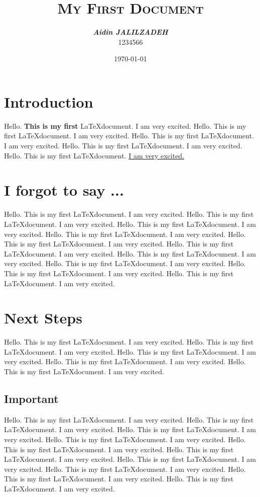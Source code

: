 \documentclass[a4paper,11pt]{article}
\title{\textsc{My First Document}}
\author{\textbf{\textit{\Large Aidin JALILZADEH}} \\ {\tiny 1234566}}
\date{\today}
\begin{document}
\maketitle

\section{Introduction}
Hello. \textbf{This is my first} \LaTeX document. I am very excited. Hello. This is my first \LaTeX document. I am very excited. Hello. This is my first \LaTeX document. I am very excited. Hello. This is my first \LaTeX document. I am very excited. Hello. This is my first \LaTeX document. \underline{I am very excited.}

\section{I forgot to say ...}
Hello. This is my first \LaTeX document. I am very excited. Hello. This is my first \LaTeX document. I am very excited. Hello. This is my first \LaTeX document. I am very excited. Hello. This is my first \LaTeX document. I am very excited. Hello. This is my first \LaTeX document. I am very excited. Hello. This is my first \LaTeX document. I am very excited. Hello. This is my first \LaTeX document. I am very excited. Hello. This is my first \LaTeX document. I am very excited. Hello. This is my first \LaTeX document. I am very excited. Hello. This is my first \LaTeX document. I am very excited.


\section{Next Steps}
Hello. This is my first \LaTeX document. I am very excited. Hello. This is my first \LaTeX document. I am very excited. Hello. This is my first \LaTeX document. I am very excited. Hello. This is my first \LaTeX document. I am very excited. Hello. This is my first \LaTeX document. I am very excited.

\subsection{Important}
Hello. This is my first \LaTeX document. I am very excited. Hello. This is my first \LaTeX document. I am very excited. Hello. This is my first \LaTeX document. I am very excited. Hello. This is my first \LaTeX document. I am very excited. Hello. This is my first \LaTeX document. I am very excited. Hello. This is my first \LaTeX document. I am very excited. Hello. This is my first \LaTeX document. I am very excited. Hello. This is my first \LaTeX document. I am very excited. Hello. This is my first \LaTeX document. I am very excited. Hello. This is my first \LaTeX document. I am very excited.
\end{document}
